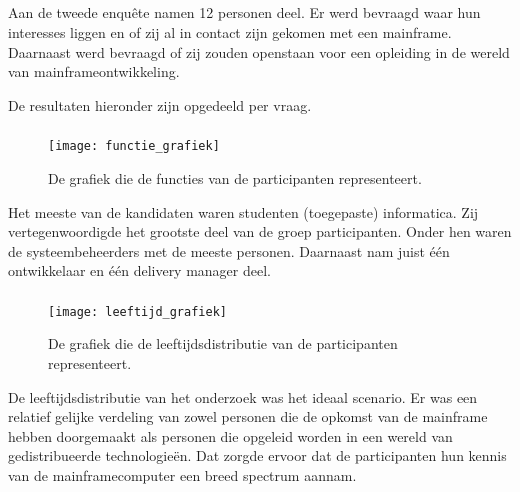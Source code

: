 \newpage

\subsection{}
\label{sec:De resultaten van de bevragingen voor studenten en IT-professionals}

Aan de tweede enquête namen 12 personen deel. Er werd bevraagd waar hun interesses liggen en of zij al in contact zijn gekomen met een mainframe. Daarnaast werd bevraagd of zij zouden openstaan voor een opleiding in de wereld van mainframeontwikkeling. 

De resultaten hieronder zijn opgedeeld per vraag.

\subsubsection{}
\label{sec:Wat is uw functie?}

 \begin{figure}[h]
    \centering
    \texttt{[image: functie\_grafiek]}
    \caption{De grafiek die  de functies van de participanten representeert.}
\end{figure}

Het meeste van de kandidaten waren studenten (toegepaste) informatica. Zij vertegenwoordigde het grootste deel van de groep participanten. Onder hen waren de systeembeheerders met de meeste personen. Daarnaast nam juist één ontwikkelaar en één delivery manager deel.  

\newpage

\subsubsection{}
\label{sec:Wat is uw leeftijd?}

 \begin{figure}[h]
    \centering
    \texttt{[image: leeftijd\_grafiek]}
    \caption{De grafiek die de leeftijdsdistributie van de participanten representeert.}
\end{figure}


De leeftijdsdistributie van het onderzoek was het ideaal scenario. Er was een relatief gelijke verdeling van zowel personen die de opkomst van de mainframe hebben doorgemaakt als personen die opgeleid worden in een wereld van gedistribueerde technologieën. Dat zorgde ervoor dat de participanten hun kennis van de mainframecomputer een breed spectrum aannam. 

